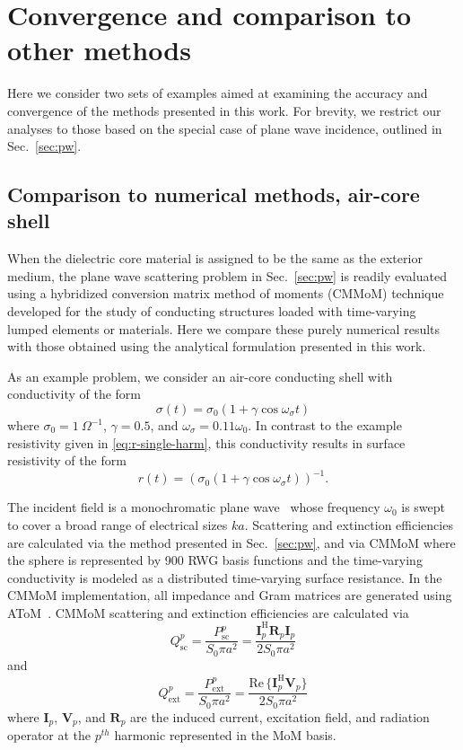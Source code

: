\documentclass[article]{IEEEtran}
\newcommand{\M}[1]{\mathbf{#1}}
\newcommand{\T}[1]{\mathrm{#1}}
\begin{document}
\section{Convergence and comparison to other methods}
\label{sec:ex-1}

Here we consider two sets of examples aimed at examining the accuracy and convergence of the methods presented in this work.  For brevity, we restrict our analyses to those based on the special case of plane wave incidence, outlined in Sec.~\ref{sec:pw}.

\subsection{Comparison to numerical methods, air-core shell}

When the dielectric core material is assigned to be the same as the exterior medium, the plane wave scattering problem in Sec.~\ref{sec:pw} is readily evaluated using a hybridized conversion matrix method of moments (CMMoM) technique~\cite{bass2021conversion} developed for the study of conducting structures loaded with time-varying lumped elements or materials. Here we compare these purely numerical results with those obtained using the analytical formulation presented in this work. 

As an example problem, we consider an air-core conducting shell with conductivity of the form
\begin{equation}
\sigma(t) = \sigma_0(1+\gamma\cos\omega_\sigma t)
\label{eq:sigma-def}
\end{equation}
where $\sigma_0 = 1~\Omega^{-1}$, $\gamma = 0.5$, and $\omega_\sigma = 0.11\omega_0$.   In contrast to the example resistivity given in \eqref{eq:r-single-harm}, this conductivity results in surface resistivity of the form
\begin{equation}
    r(t)=(\sigma_0(1+\gamma\cos\omega_\sigma t))^{-1}.
\end{equation}

The incident field is a monochromatic plane wave~ whose frequency $\omega_0$ is  swept to cover a broad range of electrical sizes $ka$.  Scattering and extinction efficiencies are calculated via the method presented in Sec.~\ref{sec:pw}, and via CMMoM where the sphere is represented by 900 RWG basis functions and the time-varying conductivity is modeled as a distributed time-varying surface resistance.  In the CMMoM implementation, all impedance and Gram matrices are generated using AToM~\cite{atom}.  CMMoM scattering and extinction efficiencies are calculated via
\begin{equation}
    Q_\T{sc}^p = \frac{P_\T{sc}^p}{S_0 \pi a^2} = \frac{\M{I}_p^\T{H}\M{R}_p\M{I}_p}{2S_0\pi a^2}
\end{equation}
and
\begin{equation}
   Q_\T{ext}^p =\frac{P_\T{ext}^p}{S_0 \pi a^2} = \frac{\T{Re}\,\{\M{I}_p^\T{H}\M{V}_p\}}{2S_0\pi a^2}
\end{equation}
where $\M{I}_p$, $\M{V}_p$, and $\M{R}_p$ are the induced current, excitation field, and radiation operator at the $p^{th}$ harmonic represented in the MoM basis.
\end{document}
